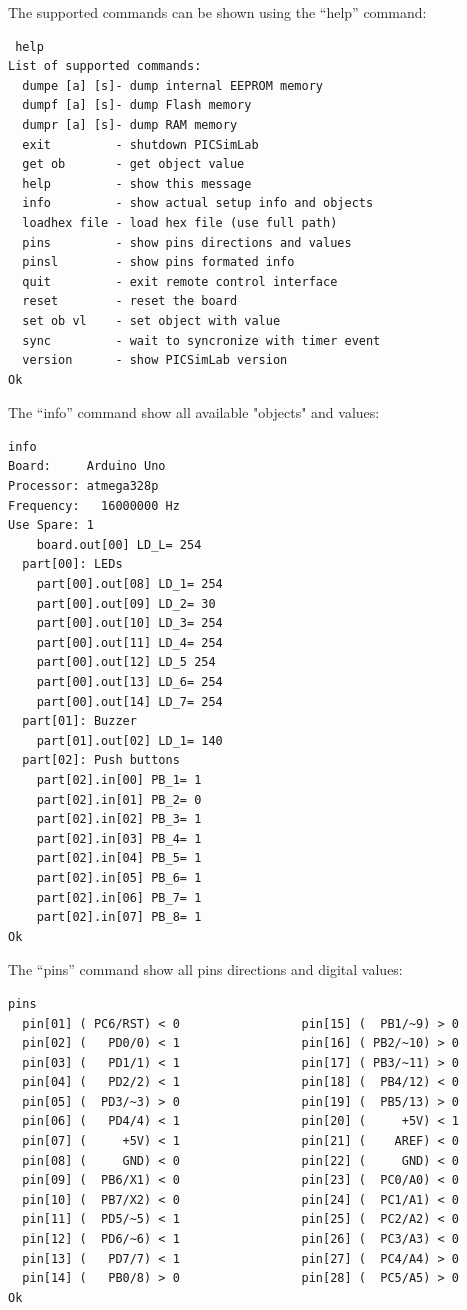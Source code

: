 The supported commands can be shown using the ``help'' command:  
\begin{verbatim}
 help
List of supported commands:
  dumpe [a] [s]- dump internal EEPROM memory
  dumpf [a] [s]- dump Flash memory
  dumpr [a] [s]- dump RAM memory
  exit         - shutdown PICSimLab
  get ob       - get object value
  help         - show this message
  info         - show actual setup info and objects
  loadhex file - load hex file (use full path)  
  pins         - show pins directions and values
  pinsl        - show pins formated info
  quit         - exit remote control interface
  reset        - reset the board
  set ob vl    - set object with value
  sync         - wait to syncronize with timer event
  version      - show PICSimLab version
Ok
\end{verbatim}
  

The ``info'' command show all available "objects" and values:
\begin{verbatim}
info
Board:     Arduino Uno
Processor: atmega328p
Frequency:   16000000 Hz
Use Spare: 1
    board.out[00] LD_L= 254
  part[00]: LEDs
    part[00].out[08] LD_1= 254
    part[00].out[09] LD_2= 30
    part[00].out[10] LD_3= 254
    part[00].out[11] LD_4= 254
    part[00].out[12] LD_5 254
    part[00].out[13] LD_6= 254
    part[00].out[14] LD_7= 254
  part[01]: Buzzer
    part[01].out[02] LD_1= 140
  part[02]: Push buttons
    part[02].in[00] PB_1= 1
    part[02].in[01] PB_2= 0
    part[02].in[02] PB_3= 1
    part[02].in[03] PB_4= 1
    part[02].in[04] PB_5= 1
    part[02].in[05] PB_6= 1
    part[02].in[06] PB_7= 1
    part[02].in[07] PB_8= 1
Ok
\end{verbatim}

The ``pins'' command show all pins directions and digital values:
\begin{verbatim}
pins
  pin[01] ( PC6/RST) < 0                 pin[15] (  PB1/~9) > 0 
  pin[02] (   PD0/0) < 1                 pin[16] ( PB2/~10) > 0 
  pin[03] (   PD1/1) < 1                 pin[17] ( PB3/~11) > 0 
  pin[04] (   PD2/2) < 1                 pin[18] (  PB4/12) < 0 
  pin[05] (  PD3/~3) > 0                 pin[19] (  PB5/13) > 0 
  pin[06] (   PD4/4) < 1                 pin[20] (     +5V) < 1 
  pin[07] (     +5V) < 1                 pin[21] (    AREF) < 0 
  pin[08] (     GND) < 0                 pin[22] (     GND) < 0 
  pin[09] (  PB6/X1) < 0                 pin[23] (  PC0/A0) < 0 
  pin[10] (  PB7/X2) < 0                 pin[24] (  PC1/A1) < 0 
  pin[11] (  PD5/~5) < 1                 pin[25] (  PC2/A2) < 0 
  pin[12] (  PD6/~6) < 1                 pin[26] (  PC3/A3) < 0 
  pin[13] (   PD7/7) < 1                 pin[27] (  PC4/A4) > 0 
  pin[14] (   PB0/8) > 0                 pin[28] (  PC5/A5) > 0 
Ok
\end{verbatim}

